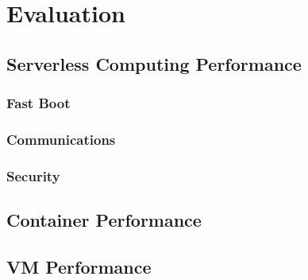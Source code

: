 
\section*{Evaluation}
\label{sec:evaluation}

\subsection*{Serverless Computing Performance}
\subsubsection*{Fast Boot}
\subsubsection*{Communications}
\subsubsection*{Security}
\subsection*{Container Performance}

\subsection*{VM Performance}